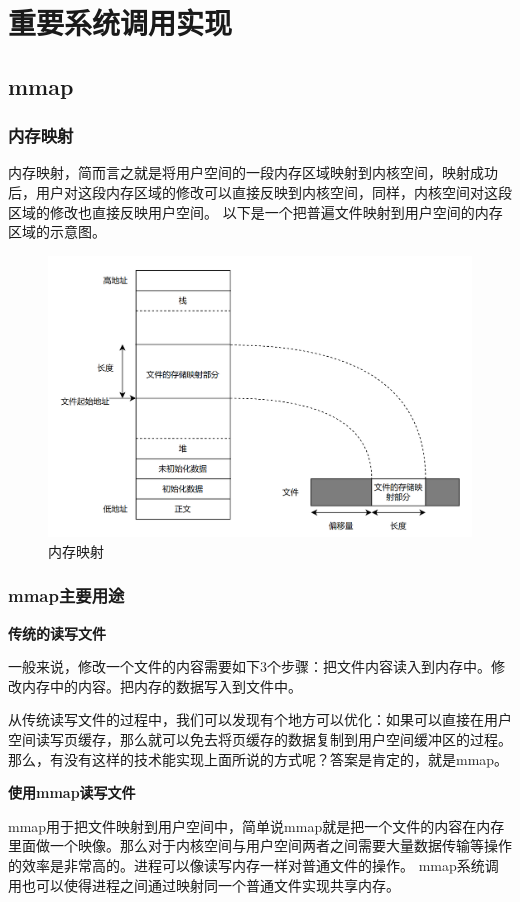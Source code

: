 \section{重要系统调用实现}
\subsection{mmap}
\subsubsection{内存映射}
内存映射，简而言之就是将用户空间的一段内存区域映射到内核空间，映射成功后，用户对这段内存区域的修改可以直接反映到内核空间，同样，内核空间对这段区域的修改也直接反映用户空间。
以下是一个把普遍文件映射到用户空间的内存区域的示意图。

\begin{figure}[H]
    \centering
    \caption[short]{内存映射}
    \includegraphics[width=0.8\linewidth]{figures/09-04-mmap-内存映射.png}
\end{figure}

\subsubsection{mmap主要用途}
\textbf{传统的读写文件}

一般来说，修改一个文件的内容需要如下3个步骤：把文件内容读入到内存中。修改内存中的内容。把内存的数据写入到文件中。

从传统读写文件的过程中，我们可以发现有个地方可以优化：如果可以直接在用户空间读写页缓存，那么就可以免去将页缓存的数据复制到用户空间缓冲区的过程。
那么，有没有这样的技术能实现上面所说的方式呢？答案是肯定的，就是mmap。

\textbf{使用mmap读写文件}

mmap用于把文件映射到用户空间中，简单说mmap就是把一个文件的内容在内存里面做一个映像。那么对于内核空间与用户空间两者之间需要大量数据传输等操作的效率是非常高的。进程可以像读写内存一样对普通文件的操作。
mmap系统调用也可以使得进程之间通过映射同一个普通文件实现共享内存。

